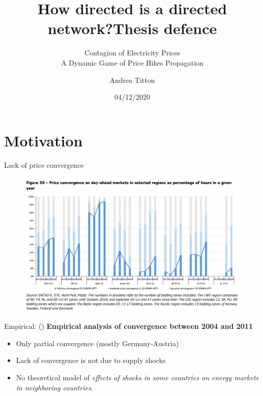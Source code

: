 \documentclass{beamer}
\title{How directed is a directed network?}
\author{Andrea Titton}
\title{Thesis defence}
\subtitle{Contagion of Electricity Prices \\ A Dynamic Game of Price Hikes Propagation}
\institute{Tinbergen Institute}
\date{04/12/2020}
\begin{document}

\frame{\titlepage}

\begin{frame}
    \tableofcontents
\end{frame}

\section{Motivation}

\begin{frame}{Lack of price convergence}
    \begin{figure}
        \includegraphics[height = 0.7\textheight]{figures/convergence.PNG}
        \caption{\cite{Report2019}}
    \end{figure}
\end{frame}

\begin{frame}{Empirical: \citeauthor{Bockers2014} (\citeyear{Bockers2014})}
    \textbf{Empirical analysis of convergence between 2004 and 2011}

    \begin{itemize} \setlength\itemsep{1.5em}
              \pause \item Only partial convergence (mostly Germany-Austria)
              \pause \item Lack of convergence is not due to supply shocks
              \pause \item No theoretical model of \textit{effects of shocks in some countries on energy markets in neighboring countries.}
    \end{itemize}

\end{frame}
\end{document}
